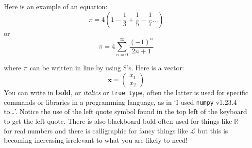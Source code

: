\documentclass[12pt]{article}
\begin{document}
Here is an example of an equation:
\begin{equation}
  \pi=4\left(1-\frac{1}{3}+\frac{1}{5}-\frac{1}{7}\ldots\right)
\end{equation}
or
\begin{equation}
  \pi=4\sum_{n=0}^\infty\frac{(-1)^{n}}{2n+1}
\end{equation}


where $\pi$ can be written in line by using \$'s. Here is a vector:
\begin{equation}
\mathbf{x}=\left(\begin{array}{c}x_1\\x_2\end{array}\right)
\end{equation}
You can write in \textbf{bold}, or \textsl{italics} or \texttt{true
  type}, often the latter is used for specific commands or libraries in a
programming language, as in `I used \texttt{numpy} v1.23.4 to\ldots'. Notice the use of the left quote symbol found in the top left of the keyboard to get the left quote. There is also blackboard bold often used for things like $\mathbb{R}$ for real numbers and there is calligraphic for fancy things like $\mathcal{L}$ but this is becoming increasing irrelevant to what you are likely to need! 
\end{document}
